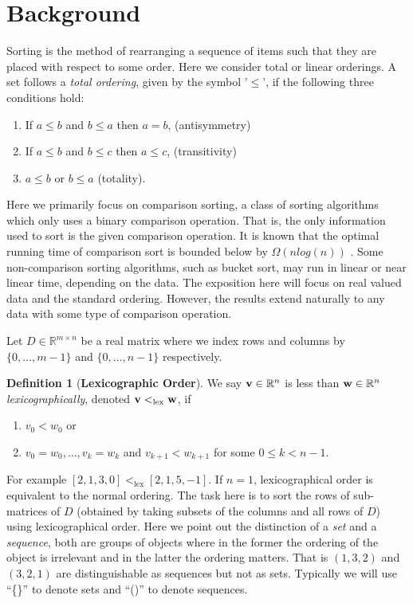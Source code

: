 \documentclass[a4paper,10pt,reqno]{amsart}
\def\ve#1{\mathchoice{\mbox{\boldmath$\displaystyle\bf#1$}}
{\mbox{\boldmath$\textstyle\bf#1$}}
{\mbox{\boldmath$\scriptstyle\bf#1$}}
{\mbox{\boldmath$\scriptscriptstyle\bf#1$}}}
\newcommand\R{\mathbb R}
\theoremstyle{definition}
\newtheorem{definition}{Definition}
\begin{document}
\section{Background}
\label{sec:background}
Sorting is the method of rearranging a sequence of items such that they are
placed with respect to some order. Here we consider total or linear orderings.
A set follows a \emph{total ordering}, given by the symbol '$\leq$', if the following 
three conditions hold:
\begin{enumerate}
    \item If $a \leq b$ and $b \leq a$ then $ a = b$, (antisymmetry)
    \item If $a \leq b$ and $b \leq c$ then $a \leq c$, (transitivity)
    \item $a \leq b$ or $b \leq a$ (totality).
\end{enumerate}
Here we primarily focus on comparison sorting, a class of sorting
algorithms which only uses a binary comparison operation. That is, the only
information used to sort is the given comparison operation. It is known that the
optimal running time of comparison sort is bounded below by $\Omega(n log(n))$
\cite{Cormen:2001fk}. Some non-comparison sorting algorithms, such as bucket
sort, may run in linear or near linear time, depending on the data.
The exposition here will focus on real valued data and the standard ordering.
However, the results extend naturally to any data with some type of comparison
operation.

Let $D \in \R^{m \times n}$ be a real matrix where we index rows and columns by
$\{0,\ldots,m-1\}$ and $\{0,\ldots,n-1\}$ respectively. 

\begin{definition}[\bf Lexicographic Order]
We say $\ve v \in \R^n$ is less
than $\ve w \in \R^n$ \emph{lexicographically}, denoted $\ve v <_{\text{lex}}
\ve w$, if 
\begin{enumerate}
    \item $v_0 < w_0$ or 
    \item $v_0 = w_0,\ldots, v_k = w_k$ and $v_{k+1} < w_{k+1}$ for some $ 0 \leq k < n-1$. 
\end{enumerate}
\end{definition}
For example $[2,1,3,0] <_{\text{lex}} [2,1,5,-1]$.  If $n=1$, lexicographical
order is equivalent to the normal ordering.  The task here is to sort
the rows of sub-matrices of $D$ (obtained by taking subsets of the columns and
all rows of $D$) using lexicographical order. Here we point out the distinction
of a \emph{set} and a \emph{sequence}, both are groups of objects where in the
former the ordering of the object is irrelevant and in the latter the ordering
matters. That is $(1,3,2)$ and $(3,2,1)$ are distinguishable as sequences but
not as sets.  Typically we will use ``\{\}'' to denote sets and ``()'' to
denote sequences.
\end{document}
